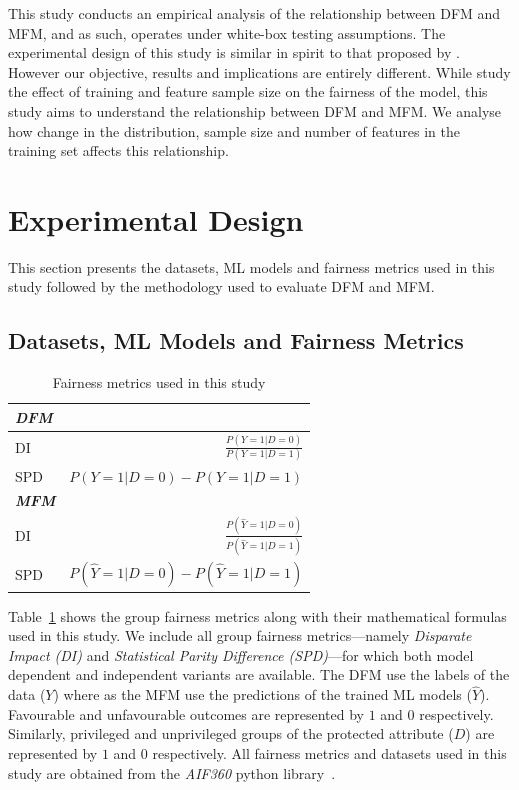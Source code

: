 \documentclass[sigconf,review,anonymous]{acmart}
\begin{document}
This study conducts an empirical analysis of the relationship between
DFM and MFM, and as such, operates under white-box testing
assumptions. The experimental design of this study is similar in
spirit to that proposed by \citeauthor{zhang2021ignorance}. However our
objective, results and implications are entirely different. While
\citeauthor{zhang2021ignorance} study the effect of training and feature
sample size on the fairness of the model, this study aims to
understand the relationship between DFM and MFM. We analyse how change
in the distribution, sample size and number of features in the
training set affects this relationship.

\section{Experimental Design}\label{sec:method}

This section presents the datasets, ML models and fairness metrics
used in this study followed by the methodology used to evaluate DFM
and MFM.

\subsection{Datasets, ML Models and Fairness Metrics}\label{sec:method-parameters}

\begin{table}
  \centering
  \begin{tabular}{l r}
    \toprule
    \textbf{\emph{DFM}}\\
    \midrule
    DI & \(\displaystyle \frac{P(Y=1|D=0)}{P(Y=1|D=1)}\)\\
    SPD & \(\displaystyle P(Y=1|D=0)-P(Y=1|D=1)\)\\
    \midrule
    \textbf{\emph{MFM}}\\
    \midrule
    DI & \(\displaystyle \frac{P(\hat{Y}=1|D=0)}{P(\hat{Y}=1|D=1)}\)\\
    SPD & \(\displaystyle P(\hat{Y}=1|D=0)-P(\hat{Y}=1|D=1)\)\\
    \bottomrule
  \end{tabular}
  \caption{Fairness metrics used in this study}
  \label{tab:fairness-metrics}
\end{table}

Table \ref{tab:fairness-metrics} shows the group fairness metrics
along with their mathematical formulas used in this study. We include
all group fairness metrics---namely \emph{Disparate Impact (DI)} and
\emph{Statistical Parity Difference (SPD)}---for which both model
dependent and independent variants are available. The DFM use the
labels of the data ($Y$) where as the MFM use the predictions of the
trained ML models ($\hat{Y}$). Favourable and unfavourable outcomes
are represented by $1$ and $0$ respectively. Similarly, privileged and
unprivileged groups of the protected attribute ($D$) are represented
by $1$ and $0$ respectively. All fairness metrics and datasets used in
this study are obtained from the \emph{AIF360} python
library \cite{bellamy2019ai}.
\end{document}
